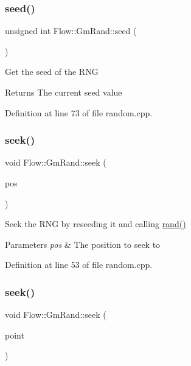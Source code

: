 \subsubsection{\texorpdfstring{seed()}{seed()}}
{\footnotesize\ttfamily unsigned int Flow\+::\+Gm\+Rand\+::seed (\begin{DoxyParamCaption}{ }\end{DoxyParamCaption})}

Get the seed of the R\+NG \begin{DoxyReturn}{Returns}
The current seed value 
\end{DoxyReturn}


Definition at line 73 of file random.\+cpp.

\hypertarget{class_flow_1_1_gm_rand_a109fe067556f62419afe48f11048acf5}{}\label{class_flow_1_1_gm_rand_a109fe067556f62419afe48f11048acf5} 
\subsubsection{\texorpdfstring{seek()}{seek()}\hspace{0.1cm}{\footnotesize\ttfamily [1/2]}}
{\footnotesize\ttfamily void Flow\+::\+Gm\+Rand\+::seek (\begin{DoxyParamCaption}\item[{unsigned int}]{pos }\end{DoxyParamCaption})}

Seek the R\+NG by reseeding it and calling \hyperlink{class_flow_1_1_gm_rand_a638c37993080f31a9857d11c284c15b5}{rand()} 
\begin{DoxyParams}{Parameters}
{\em pos} & The position to seek to \\
\hline
\end{DoxyParams}


Definition at line 53 of file random.\+cpp.

\hypertarget{class_flow_1_1_gm_rand_a75eb20ea46c459b53793960e711dd81c}{}\label{class_flow_1_1_gm_rand_a75eb20ea46c459b53793960e711dd81c} 
\subsubsection{\texorpdfstring{seek()}{seek()}\hspace{0.1cm}{\footnotesize\ttfamily [2/2]}}
{\footnotesize\ttfamily void Flow\+::\+Gm\+Rand\+::seek (\begin{DoxyParamCaption}\item[{const \hyperlink{struct_flow_1_1_r_n_g_point}{R\+N\+G\+Point} \&}]{point }\end{DoxyParamCaption})}

